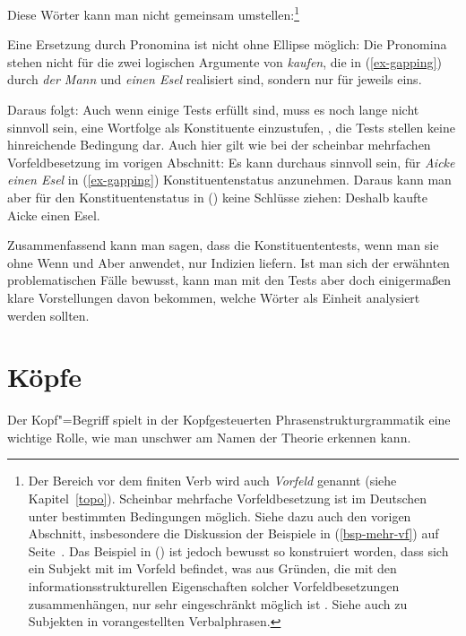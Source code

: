 Diese Wörter kann man nicht gemeinsam umstellen:\footnote{
  Der Bereich vor dem finiten Verb wird auch \emph{Vorfeld} genannt (siehe Kapitel~\ref{topo}).
  Scheinbar mehrfache Vorfeldbesetzung ist im Deutschen unter bestimmten
  Bedingungen möglich. Siehe dazu auch den vorigen Abschnitt, insbesondere
  die Diskussion der Beispiele in (\ref{bsp-mehr-vf}) auf Seite~\pageref{bsp-mehr-vf}.
  Das Beispiel in () ist jedoch bewusst so konstruiert worden, 
  dass sich ein Subjekt mit im Vorfeld befindet, was aus Gründen, die 
  mit den informationsstrukturellen Eigenschaften solcher Vorfeldbesetzungen
  zusammenhängen, nur sehr eingeschränkt möglich ist \citep[]{MBC2012a}. Siehe auch  zu Subjekten
  in vorangestellten Verbalphrasen.%
}
\z

Eine Ersetzung durch Pronomina ist nicht ohne Ellipse möglich:
\eal
{}
\zl
Die Pronomina stehen nicht für die zwei logischen Argumente von \emph{kaufen}, die
in (\ref{ex-gapping})  \zb durch \emph{der Mann} und \emph{einen Esel} realisiert sind,
sondern nur für jeweils eins.

Daraus folgt: Auch wenn einige Tests erfüllt sind, muss es noch lange nicht sinnvoll sein,
eine Wortfolge als Konstituente einzustufen, \dash, die Tests stellen keine hinreichende
Bedingung dar. Auch hier gilt wie bei der scheinbar mehrfachen Vorfeldbesetzung im vorigen Abschnitt: Es kann durchaus
sinnvoll sein, für \emph{Aicke einen Esel} in (\ref{ex-gapping}) Konstituentenstatus
anzunehmen. Daraus kann man aber für den Konstituentenstatus in () keine Schlüsse ziehen:
\ea
Deshalb kaufte Aicke einen Esel.
\z


Zusammenfassend kann man sagen, dass die Konstituententests, wenn man sie ohne Wenn und Aber
anwendet, nur Indizien liefern. Ist man sich der erwähnten problematischen Fälle bewusst,
kann man mit den Tests aber doch einigermaßen klare Vorstellungen davon bekommen, welche
Wörter als Einheit analysiert werden sollten.

\section{Köpfe}

Der Kopf"=Begriff spielt in der Kopfgesteuerten Phrasenstrukturgrammatik
eine wichtige Rolle, wie man unschwer am Namen der Theorie erkennen kann.


